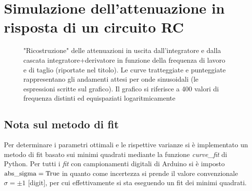 \documentclass{article}[a4paper, oneside ,11pt]
\begin{document}
\section{Simulazione dell'attenuazione in risposta di un circuito RC}
\begin{figure}[!htb]
	\centering 
 		\scalebox{0.9}{}
 	\caption{"Ricostruzione" delle attenuazioni in uscita dall’integratore e dalla cascata integratore+derivatore in funzione della frequenza di lavoro e di taglio (riportate nel titolo). Le curve tratteggiate e punteggiate rappresentano gli andamenti attesi per onde sinusoidali (le espressioni scritte sul grafico). Il grafico si riferisce a 400 valori di frequenza distinti ed equispaziati logaritmicamente \label{plt:gain}}
\end{figure}
\subsection*{Nota sul metodo di fit}
Per determinare i parametri ottimali e le rispettive varianze si \`e implementato un metodo di fit basato sui minimi quadrati mediante la funzione \emph{curve\_fit} di Python.
Per tutti i \emph{fit} con campionamenti digitali di Arduino si è imposto $\rm{abs\_sigma} = \rm True$ in quanto come incertezza si prende il valore convenzionale $\sigma = \pm 1$ [digit], per cui effettivamente si sta eseguendo un fit dei minimi quadrati.\\
\medskip


\end{document}
